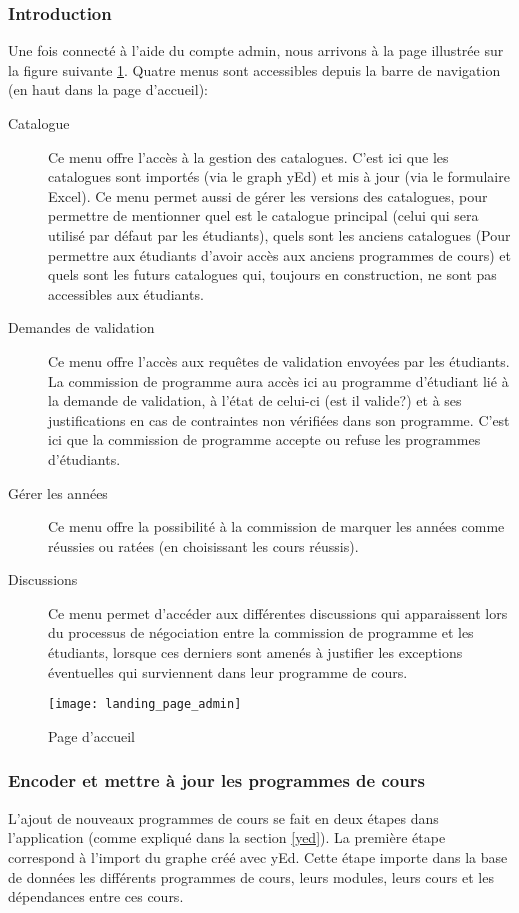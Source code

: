 \subsubsection{Introduction}
 Une fois connecté à l'aide du compte admin, nous arrivons à la page illustrée sur la figure suivante \ref{fig:landing_page_admin}. Quatre menus sont accessibles depuis la barre de navigation (en haut dans la page d’accueil):
 \begin{description}
  \item [Catalogue] Ce menu offre l'accès à la gestion des catalogues. C'est ici que les catalogues sont importés (via le graph yEd) et mis à jour (via le formulaire Excel). Ce menu permet aussi de gérer les versions des catalogues, pour permettre de mentionner quel est le catalogue principal (celui qui sera utilisé par défaut par les étudiants), quels sont les anciens catalogues (Pour permettre aux étudiants d'avoir accès aux anciens programmes de cours) et quels sont les futurs catalogues qui, toujours en construction, ne sont pas accessibles aux étudiants. 
  \item [Demandes de validation] Ce menu offre l'accès aux requêtes de validation envoyées par les étudiants. La commission de programme aura accès ici au programme d'étudiant lié à la demande de validation, à l'état de celui-ci (est il valide?) et à ses justifications en cas de contraintes non vérifiées dans son programme. C'est ici que la commission de programme accepte ou refuse les programmes d'étudiants.
  \item [Gérer les années] Ce menu offre la possibilité à la commission de marquer les années comme réussies ou ratées (en choisissant les cours réussis). 
  \item [Discussions] Ce menu permet d'accéder aux différentes discussions qui apparaissent lors du processus de négociation entre la commission de programme et les étudiants, lorsque ces derniers sont amenés à justifier les exceptions éventuelles qui surviennent dans leur programme de cours. 
  \end{description}
\begin{figure}
\caption{Page d’accueil}
\label{fig:landing_page_admin}
\texttt{[image: landing\_page\_admin]}
\end{figure}

\subsubsection{Encoder et mettre à jour les programmes de cours}
L'ajout de nouveaux programmes de cours se fait en deux étapes dans l'application (comme expliqué dans la section \ref{yed}). La première étape correspond à l'import du graphe créé avec yEd. Cette étape importe dans la base de données les différents programmes de cours, leurs modules, leurs cours et les dépendances entre ces cours.

